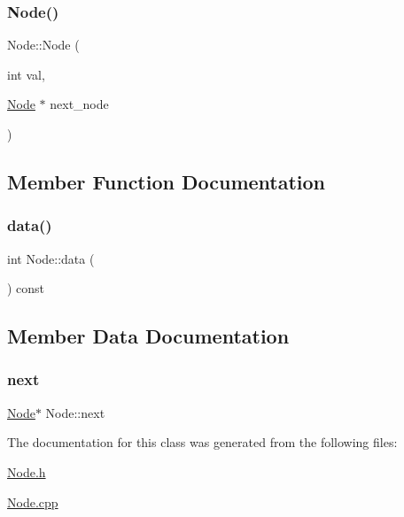 \subsubsection{\texorpdfstring{Node()}{Node()}\hspace{0.1cm}{\footnotesize\ttfamily [2/2]}}
{\footnotesize\ttfamily Node\+::\+Node (\begin{DoxyParamCaption}\item[{int}]{val,  }\item[{\mbox{\hyperlink{classNode}{Node}} $\ast$}]{next\+\_\+node }\end{DoxyParamCaption})}



\subsection{Member Function Documentation}
\mbox{\label{classNode_a1f22dfa731ed0a407e0cf5fa70367c31}} 
\subsubsection{\texorpdfstring{data()}{data()}}
{\footnotesize\ttfamily int Node\+::data (\begin{DoxyParamCaption}{ }\end{DoxyParamCaption}) const\hspace{0.3cm}{\ttfamily [inline]}}



\subsection{Member Data Documentation}
\mbox{\label{classNode_a2559a716f69ccaa76d648d9f1b83065e}} 
\subsubsection{\texorpdfstring{next}{next}}
{\footnotesize\ttfamily \mbox{\hyperlink{classNode}{Node}}$\ast$ Node\+::next}



The documentation for this class was generated from the following files\+:\begin{DoxyCompactItemize}
\item 
\mbox{\hyperlink{Node_8h}{Node.\+h}}\item 
\mbox{\hyperlink{Node_8cpp}{Node.\+cpp}}\end{DoxyCompactItemize}
